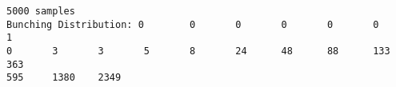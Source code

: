 \documentclass[11pt]{article}
\makeatletter
\newcommand{\boxspacing}{\kern\kvtcb@left@rule\kern\kvtcb@boxsep}
\newcommand{\prompt}[4]{
        {\ttfamily\llap{{\color{#2}[#3]:\hspace{3pt}#4}}\vspace{-\baselineskip}}
    }
\makeatother
\begin{document}
    \begin{Verbatim}[commandchars=\\\{\}]
5000 samples
Bunching Distribution: 0        0       0       0       0       0       1
0       3       3       5       8       24      48      88      133     363
595     1380    2349
    \end{Verbatim}

    \begin{tcolorbox}[breakable, size=fbox, boxrule=1pt, pad at break*=1mm,colback=cellbackground, colframe=cellborder]
\prompt{In}{incolor}{ }{\boxspacing}
\begin{Verbatim}[commandchars=\\\{\}]

\end{Verbatim}
\end{tcolorbox}


    
    
    
\end{document}
